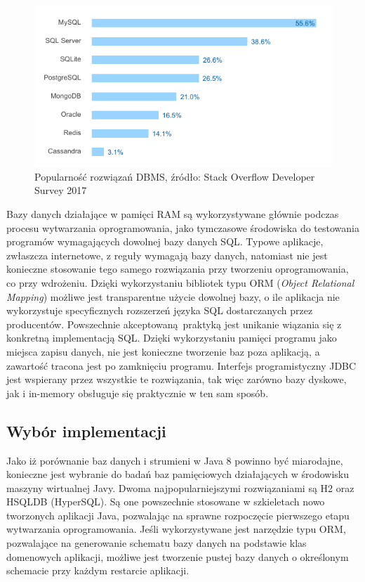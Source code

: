 \documentclass[12pt]{extarticle}
\begin{document}
\begin{figure}
\centering
\includegraphics{dbstats.png}
\caption{Popularność rozwiązań DBMS, źródło: Stack Overflow Developer Survey 2017}
\label{fig:dbstats}
\end{figure}

      Bazy danych działające w pamięci RAM są wykorzystywane głównie podczas procesu wytwarzania oprogramowania, jako tymczasowe środowiska do testowania programów wymagających dowolnej bazy danych SQL. Typowe aplikacje, zwłaszcza internetowe, z reguły wymagają bazy danych, natomiast nie jest konieczne stosowanie tego samego rozwiązania przy tworzeniu oprogramowania, co przy wdrożeniu. Dzięki wykorzystaniu bibliotek typu ORM (\textit{Object Relational Mapping}) możliwe jest transparentne użycie dowolnej bazy, o ile aplikacja nie wykorzystuje specyficznych rozszerzeń języka SQL dostarczanych przez producentów. Powszechnie akceptowaną praktyką jest unikanie wiązania się z konkretną implementacją SQL. Dzięki wykorzystaniu pamięci programu jako miejsca zapisu danych, nie jest konieczne tworzenie baz poza aplikacją, a zawartość tracona jest po zamknięciu programu. Interfejs programistyczny JDBC jest wspierany przez wszystkie te rozwiązania, tak więc zarówno bazy dyskowe, jak i in-memory obsługuje się praktycznie w ten sam sposób. 

\subsection{Wybór implementacji}

    Jako iż porównanie baz danych i strumieni w Java 8 powinno być miarodajne, konieczne jest wybranie do badań baz pamięciowych działających w środowisku maszyny wirtualnej Javy. Dwoma najpopularniejszymi rozwiązaniami są H2 oraz HSQLDB (HyperSQL). Są one powszechnie stosowane w szkieletach nowo tworzonych aplikacji Java, pozwalając na sprawne rozpoczęcie pierwszego etapu wytwarzania oprogramowania. Jeśli wykorzystywane jest narzędzie typu ORM, pozwalające na generowanie schematu bazy danych na podstawie klas domenowych aplikacji, możliwe jest tworzenie pustej bazy danych o określonym schemacie przy każdym restarcie aplikacji. 
    
\end{document}
